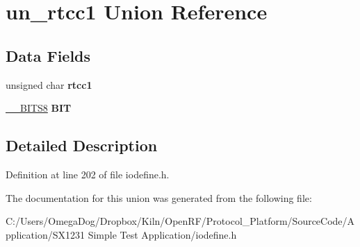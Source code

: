 \hypertarget{unionun__rtcc1}{\section{un\-\_\-rtcc1 Union Reference}
\label{unionun__rtcc1}
}
\subsection*{Data Fields}
\begin{DoxyCompactItemize}
\item 
\hypertarget{unionun__rtcc1_add495f0122933b2e58b873691be77ff0}{unsigned char {\bfseries rtcc1}}\label{unionun__rtcc1_add495f0122933b2e58b873691be77ff0}

\item 
\hypertarget{unionun__rtcc1_a6ebcb0b641d39043d33c71a7e1deb701}{\hyperlink{struct_____b_i_t_s8}{\-\_\-\-\_\-\-B\-I\-T\-S8} {\bfseries B\-I\-T}}\label{unionun__rtcc1_a6ebcb0b641d39043d33c71a7e1deb701}

\end{DoxyCompactItemize}


\subsection{Detailed Description}


Definition at line 202 of file iodefine.\-h.



The documentation for this union was generated from the following file\-:\begin{DoxyCompactItemize}
\item 
C\-:/\-Users/\-Omega\-Dog/\-Dropbox/\-Kiln/\-Open\-R\-F/\-Protocol\-\_\-\-Platform/\-Source\-Code/\-Application/\-S\-X1231 Simple Test Application/iodefine.\-h\end{DoxyCompactItemize}
